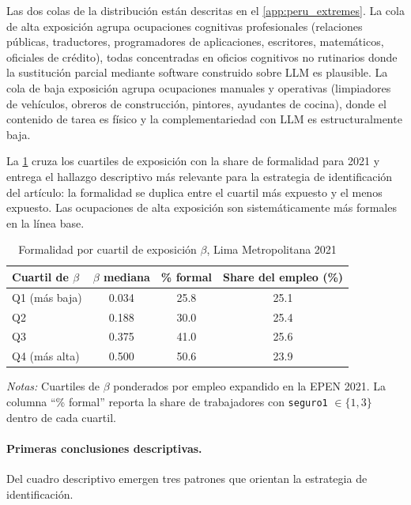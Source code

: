 Las dos colas de la distribuci\'{o}n est\'{a}n descritas en el \cref{app:peru_extremes}. La cola de alta exposici\'{o}n agrupa ocupaciones cognitivas profesionales (relaciones p\'{u}blicas, traductores, programadores de aplicaciones, escritores, matem\'{a}ticos, oficiales de cr\'{e}dito), todas concentradas en oficios cognitivos no rutinarios donde la sustituci\'{o}n parcial mediante software construido sobre LLM es plausible. La cola de baja exposici\'{o}n agrupa ocupaciones manuales y operativas (limpiadores de veh\'{i}culos, obreros de construcci\'{o}n, pintores, ayudantes de cocina), donde el contenido de tarea es f\'{i}sico y la complementariedad con LLM es estructuralmente baja.

La \cref{tab:peru_beta_formal} cruza los cuartiles de exposici\'{o}n con la share de formalidad para 2021 y entrega el hallazgo descriptivo m\'{a}s relevante para la estrategia de identificaci\'{o}n del art\'{i}culo: la formalidad se duplica entre el cuartil m\'{a}s expuesto y el menos expuesto. Las ocupaciones de alta exposici\'{o}n son sistem\'{a}ticamente m\'{a}s formales en la l\'{i}nea base.

\begin{table}[H]
\centering
\small
\begin{threeparttable}
\caption{Formalidad por cuartil de exposici\'{o}n $\beta$, Lima Metropolitana 2021}
\label{tab:peru_beta_formal}
\begin{tabular}{l c c c}
\toprule
Cuartil de $\beta$ & $\beta$ mediana & \% formal & Share del empleo (\%) \\
\midrule
Q1 (m\'{a}s baja)  & 0.034 & 25.8 & 25.1 \\
Q2                 & 0.188 & 30.0 & 25.4 \\
Q3                 & 0.375 & 41.0 & 25.6 \\
Q4 (m\'{a}s alta)  & 0.500 & 50.6 & 23.9 \\
\bottomrule
\end{tabular}
\begin{tablenotes}[flushleft]
\footnotesize
\item \emph{Notas:} Cuartiles de $\beta$ ponderados por empleo expandido en la EPEN 2021. La columna ``\% formal'' reporta la share de trabajadores con \texttt{seguro1} $\in \{1, 3\}$ dentro de cada cuartil.
\end{tablenotes}
\end{threeparttable}
\end{table}

\paragraph{Primeras conclusiones descriptivas.} Del cuadro descriptivo emergen tres patrones que orientan la estrategia de identificaci\'{o}n.


